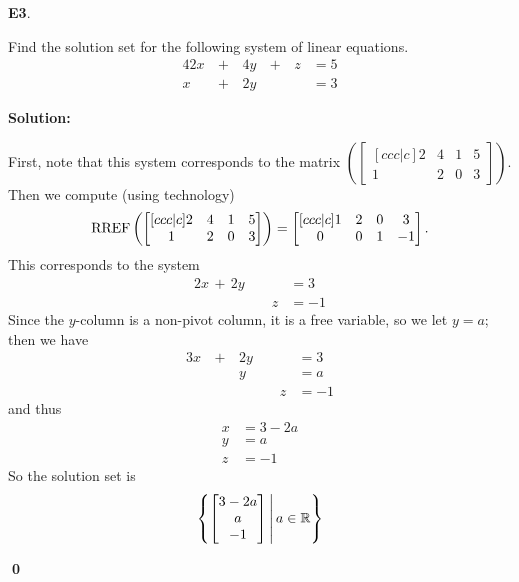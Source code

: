 \documentclass{article}
\newenvironment{problem}[1]
{
  \begin{flushleft}
  \textbf{#1}.
  \ignorespaces
}
{
  \end{flushleft}
}
\newenvironment{solution}
{
  \ignorespaces
  \textbf{Solution:}
}
{
  \ignorespacesafterend
  \begin{flushright}
  {\bfseries \qed}
  \end{flushright}
}
\begin{document}
\begin{problem}{E3}
Find the solution set for the following system of linear equations.
\begin{alignat*}{4}
2x&\,+\,&4y&\,+\,&z &= 5 \\
x&\,+\,&2y &\,\,& &= 3
\end{alignat*}
\end{problem}
\begin{solution}
First, note that this system corresponds to the matrix 
\( \left( \begin{bmatrix}[ccc|c] 2 & 4 & 1 & 5 \\ 1 & 2 & 0 & 3 \end{bmatrix} \right)\).
Then we compute (using technology) 
\[
  \operatorname{RREF} \left(
    \begin{bmatrix}[ccc|c] 2 & 4 & 1 & 5 \\ 1 & 2 & 0 & 3 \end{bmatrix}
  \right)
    =
  \begin{bmatrix}[ccc|c] 1 & 2 & 0 & 3 \\ 0 & 0 & 1 & -1\end{bmatrix}.
\]
This corresponds to the system
\begin{alignat*}{2}
x\,+\,2y&\,\,&  &= 3 \\
  &\,\,& z&= -1
\end{alignat*}
Since the $y$-column is a non-pivot column, it is a free variable, so we let $y=a$; then we have
\begin{alignat*}{3}
x&\,+\,&2y&\,\,&  &= 3 \\
 &\,\,&y &\,\,& &=a \\
 &\,\,& &\,\,& z&= -1
\end{alignat*}
and thus
\begin{align*}
x&= 3-2a \\
y&= a \\
z&= -1
\end{align*}
So the solution set is
\[
  \left\{
    \begin{bmatrix} 3-2a \\ a \\ -1 \end{bmatrix}
  \,\middle|\,
    a \in \mathbb{R}
  \right\}
\]
\end{solution}
\end{document}
